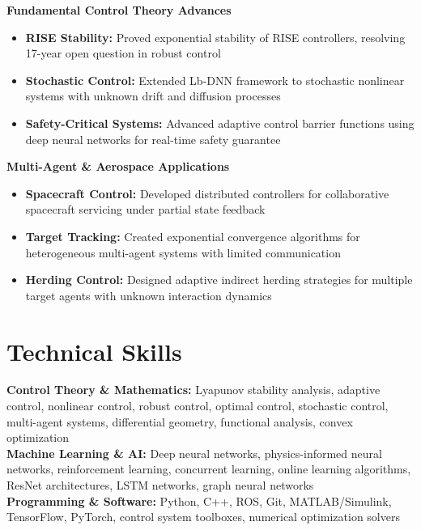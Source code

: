 \documentclass[10pt, letterpaper]{article}
\begin{document}
\textbf{Fundamental Control Theory Advances}
\begin{itemize}[leftmargin=20pt, itemsep=1pt]
    \item \textbf{RISE Stability:} Proved exponential stability of RISE controllers, resolving 17-year open question in robust control
    \item \textbf{Stochastic Control:} Extended Lb-DNN framework to stochastic nonlinear systems with unknown drift and diffusion processes
    \item \textbf{Safety-Critical Systems:} Advanced adaptive control barrier functions using deep neural networks for real-time safety guarantee
\end{itemize}

\textbf{Multi-Agent \& Aerospace Applications}
\begin{itemize}[leftmargin=20pt, itemsep=1pt]
    \item \textbf{Spacecraft Control:} Developed distributed controllers for collaborative spacecraft servicing under partial state feedback
    \item \textbf{Target Tracking:} Created exponential convergence algorithms for heterogeneous multi-agent systems with limited communication
    \item \textbf{Herding Control:} Designed adaptive indirect herding strategies for multiple target agents with unknown interaction dynamics
\end{itemize}

\section{Technical Skills}

\textbf{Control Theory \& Mathematics:} Lyapunov stability analysis, adaptive control, nonlinear control, robust control, optimal control, stochastic control, multi-agent systems, differential geometry, functional analysis, convex optimization\\

\textbf{Machine Learning \& AI:} Deep neural networks, physics-informed neural networks, reinforcement learning, concurrent learning, online learning algorithms, ResNet architectures, LSTM networks, graph neural networks\\

\textbf{Programming \& Software:} Python, C++, ROS, Git, MATLAB/Simulink, TensorFlow, PyTorch, control system toolboxes, numerical optimization solvers\\
\end{document}
